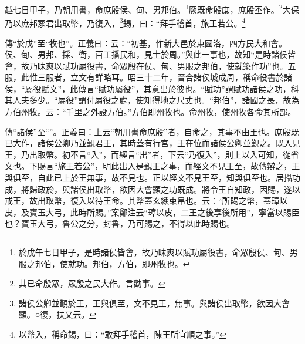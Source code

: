 越七日甲子，乃朝用書，命庶殷侯、甸、男邦伯。\footnote{於戊午七日甲子，是時諸侯皆會，故乃昧爽以賦功屬役書，命眾殷侯、甸、男服之邦伯，使就功。邦伯，方伯，即州牧也。}厥既命殷庶，庶殷丕作。\footnote{其已命殷眾，眾殷之民大作。言勸事。}大保乃以庶邦冢君出取幣，乃復入，\footnote{諸侯公卿並覲於王，王與俱至，文不見王，無事。與諸侯出取幣，欲因大會顯。○復，扶又云。}錫，曰：“拜手稽首，旅王若公。\footnote{以幣入，稱命錫，曰：“敢拜手稽首，陳王所宜順之事。”}

{\noindent\zhuan{}\fzbyks 傳“於戊”至“牧也”。正義曰：云：“初基，作新大邑於東國洛，四方民大和會。侯、甸、男邦、採、衛，百工播民和，見士於周。”與此一事也，故知“是時諸侯皆會，故乃昧爽以賦功屬役書，命眾殷在侯、甸、男服之邦伯，使就築作功”也。五服，此惟三服者，立文有詳略耳。昭三十二年，晉合諸侯城成周，稱命役書於諸侯，“屬役賦文”，此傳言“賦功屬役”，其意出於彼也。“賦功”謂賦功諸侯之功，科其人夫多少。“屬役”謂付屬役之處，使知得地之尺丈也。“邦伯”，諸國之長，故為方伯州牧。云：“千里之外設方伯。”方伯即州牧也。命州牧，使州牧各命其所部。 \par}

{\noindent\zhuan{}\fzbyks 傳“諸侯”至“”。正義曰：上云“朝用書命庶殷”者，自命之，其事不由王也。庶殷既已大作，諸侯公卿乃並覲君王，其時蓋有行宮，王在位而諸侯公卿並覲之。既入見王，乃出取幣。初不言“入”，而經言“出”者，下云“乃復入”，則上以入可知，從省文也。下賜言“旅王若公”，明此出入是覲王之事，而經文不見王至，故傳辯之，王與俱至，自此已上於王無事，故不見也。正以經文不見王至，知與俱至也。居攝功成，將歸政於，與諸侯出取幣，欲因大會顯之功既成。將令王自知政，因賜，遂以戒王，故出取幣，復入以待王命。其幣蓋玄纁束帛也。云：“所賜之幣，蓋璋以皮，及寶玉大弓，此時所賜。”案鄭注云“璋以皮，二王之後享後所用”，寧當以賜臣也？寶玉大弓，魯公之分，封魯，乃可賜之，不得以此時賜也。 \par}

